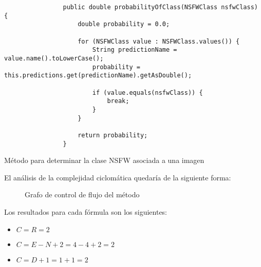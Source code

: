 \begin{codeBlock}
	\begin{verbatim}
				public double probabilityOfClass(NSFWClass nsfwClass) {
					double probability = 0.0;

					for (NSFWClass value : NSFWClass.values()) {
						String predictionName = value.name().toLowerCase();
						probability = this.predictions.get(predictionName).getAsDouble();

						if (value.equals(nsfwClass)) {
							break;
						}
					}

					return probability;
				}
	\end{verbatim}
	\caption{Método para determinar la clase NSFW asociada a una imagen}
\end{codeBlock}
\label{cod:codigo-pruebas-unitarias-caja-blanca}

El análisis de la complejidad ciclomática quedaría de la siguiente forma:

\begin{figure}[H]
	\centering
	\caption{Grafo de control de flujo del método }
	\label{fig:grafo-control-flujo-pruebas-unitarias-caja-blanca}
\end{figure}

Los resultados para cada fórmula son los siguientes:

\begin{itemize}
	\item $C = R = 2$
	\item $C = E - N + 2 = 4 - 4 + 2 = 2$
	\item $C = D + 1 = 1 + 1 = 2$
\end{itemize}

